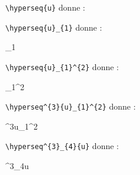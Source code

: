 \documentclass[varwidth, border = 3pt]{standalone}
\begin{document}
\verb#\hyperseq{u}# donne :



\verb#\hyperseq{u}_{1}# donne :

_{1}


\verb#\hyperseq{u}_{1}^{2}# donne :

_{1}^{2}


\verb#\hyperseq^{3}{u}_{1}^{2}# donne :

\hyperseq^{3}{u}_{1}^{2}


\verb#\hyperseq^{3}_{4}{u}# donne :

\hyperseq^{3}_{4}{u} 
\end{document}
